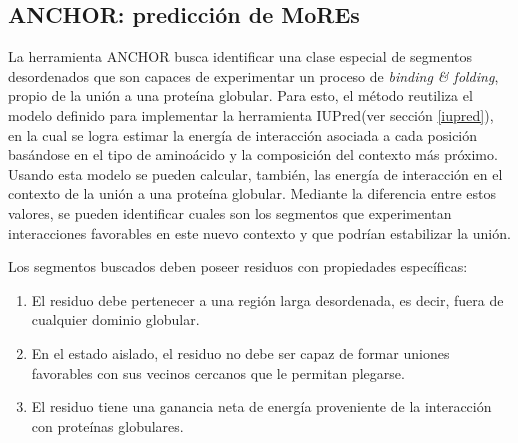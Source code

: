 \subsection{ANCHOR: predicción de MoREs} \label{anchor}

La herramienta ANCHOR\cite{meszaros2009prediction} busca identificar una clase especial de segmentos desordenados que son capaces de experimentar un proceso de \textit{binding \& folding}, 
propio de la unión a una proteína globular.
Para esto, el método reutiliza el modelo definido para implementar la herramienta IUPred(ver sección \ref{iupred}), en la cual se logra estimar la energía de interacción asociada a cada posición basándose en 
el tipo de aminoácido y la composición del contexto más próximo. Usando esta modelo se pueden calcular, también, las energía de interacción en el contexto de la unión a una proteína globular.
Mediante la diferencia entre estos valores, se pueden identificar cuales son los segmentos que experimentan interacciones favorables en este nuevo contexto y que podrían estabilizar la unión. 

Los segmentos buscados deben poseer residuos con propiedades específicas:
\begin{enumerate}
 \item El residuo debe pertenecer a una región larga desordenada, es decir, fuera de cualquier dominio globular.
 \item En el estado aislado, el residuo no debe ser capaz de formar uniones favorables con sus vecinos cercanos que le permitan plegarse.
 \item El residuo tiene una ganancia neta de energía proveniente de la interacción con proteínas globulares.
 \end{enumerate}

